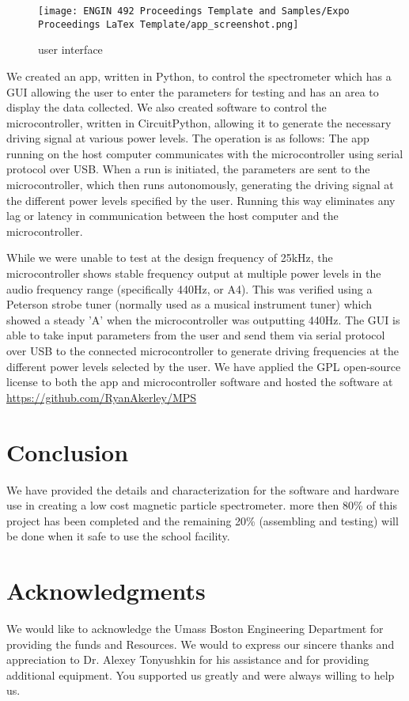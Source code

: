 \documentclass[fleqn,10pt]{document} %
\begin{document}
	\begin{figure}[ht]
	    \centering
	    \texttt{[image: ENGIN 492 Proceedings Template and Samples/Expo Proceedings LaTex Template/app\_screenshot.png]}
	    \caption{user interface}
	    \label{fig:user_interface}
	\end{figure}
	
We created an app, written in Python, to control the spectrometer which has a GUI allowing the user to enter the parameters for testing and has an area to display the data collected. We also created software to control the microcontroller, written in CircuitPython, allowing it to generate the necessary driving signal at various power levels. The operation is as follows: The app running on the host computer communicates with the microcontroller using serial protocol over USB. When a run is initiated, the parameters are sent to the microcontroller, which then runs autonomously, generating the driving signal at the different power levels specified by the user. Running this way eliminates any lag or latency in communication between the host computer and the microcontroller.

While we were unable to test at the design frequency of 25kHz, the microcontroller shows stable frequency output at multiple power levels in the audio frequency range (specifically 440Hz, or A4). This was verified using a Peterson strobe tuner (normally used as a musical instrument tuner) which showed a steady 'A' when the microcontroller was outputting 440Hz. The GUI is able to take input parameters from the user and send them via serial protocol over USB to the connected microcontroller to generate driving frequencies at the different power levels selected by the user. We have applied the GPL open-source license to both the app and microcontroller software and hosted the software at \url{https://github.com/RyanAkerley/MPS}


	\section{Conclusion}
We have provided the details and characterization for the software and hardware use in creating a low cost magnetic particle spectrometer. more then 80\% of this project has been completed and the remaining 20\% (assembling and testing) will be done when it safe to use the school facility. 

	\section*{Acknowledgments} 
	
	
We would like to acknowledge the Umass Boston Engineering Department for providing the funds and Resources.
We would to express our sincere thanks and appreciation to Dr. Alexey Tonyushkin for his assistance and for providing additional equipment. You supported us greatly and were always willing to help us.


	
	

	
\end{document}
